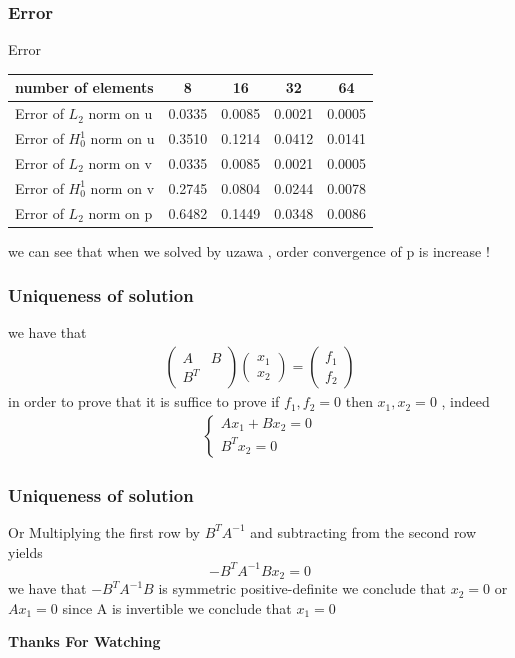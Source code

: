 \documentclass[11pt]{beamer}
\numberwithin{equation}{section}
\theoremstyle{plain}
\theoremstyle{definition}
\theoremstyle{remark}
\begin{document}
\begin{frame}\frametitle{Error}
\begin{block}{Error}
\begin{tabular}{|l||c||c||c||c|}
\hline 
number of elements  & 8 & 16 & 32 & 64  \\ 
\hline 
Error of $L_2$ norm on u  & 0.0335  &0.0085 & 0.0021 & 0.0005  \\
\hline
Error of $H_0^1$ norm on u  & 0.3510 & 0.1214 & 0.0412 & 0.0141  \\
\hline
Error of $L_2$ norm on v  & 0.0335  &0.0085 & 0.0021 & 0.0005  \\
\hline
Error of $H_0^1$ norm on v  & 0.2745 & 0.0804 & 0.0244 & 0.0078  \\
\hline
Error of $L_2$ norm on p  & 0.6482  &0.1449 & 0.0348 & 0.0086  \\
\hline
\end{tabular}
we can see that when we solved by uzawa , order convergence of p is increase ! 
\end{block}
\end{frame}

\begin{frame}\frametitle{Uniqueness of solution}
we have that 
\begin{align*}
\begin{pmatrix}
A & B\\ 
B^T & 
\end{pmatrix}\begin{pmatrix}
x_1\\ 
x_2
\end{pmatrix}=\begin{pmatrix}
f_1\\ 
f_2
\end{pmatrix}
\end{align*}
in order to prove that it is suffice to prove if $f_1,f_2=0$ then $x_1,x_2=0$ , indeed
\begin{align*}
\left\{\begin{matrix}
Ax_1+Bx_2=0 \\ 
B^Tx_2=0
\end{matrix}\right.
\end{align*}
\end{frame}
\begin{frame}\frametitle{Uniqueness of solution}
Or
Multiplying the first row by $B^TA^{-1}$ and subtracting from the second row yields 
$$-B^TA^{-1}Bx_2=0$$ 
we have that $-B^TA^{-1}B$ is symmetric positive-definite we conclude that $x_2=0$ or $Ax_1=0$ since A is invertible we conclude that $x_1=0$
\end{frame}
\begin{frame}
\begin{center}
\huge{ \textbf{Thanks For Watching}}
\end{center}
 \end{frame}
\end{document}
